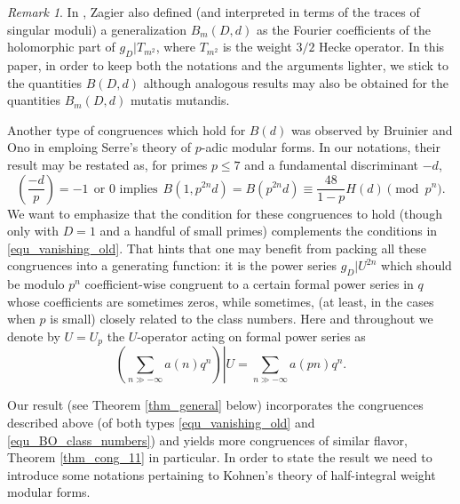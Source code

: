 \documentclass[11pt,letterpaper]{amsart}
\newcommand{\Q}{{\mathbb Q}}
\theoremstyle{remark}
\newtheorem*{rem}{Remark}
\begin{document}
\begin{rem}
In \cite{Zagier_traces}, Zagier also defined (and interpreted in terms of the traces of singular moduli) a generalization $B_m(D,d)$ as the Fourier coefficients of the holomorphic part of $g_D| T_{m^2}$, where $T_{m^2}$ is the weight $3/2$ Hecke operator. 
In this paper, in order to keep both the notations and the arguments lighter, we stick to the quantities $B(D,d)$ although analogous results may also be obtained for the quantities $B_m(D,d)$ mutatis mutandis. 
\end{rem}

Another type of congruences which hold for $B(d)$ was observed by Bruinier and Ono in \cite[Corollary 3]{BO} emploing Serre's theory of $p$-adic modular forms.
In our notations, their result may be restated as, 
for  primes $p \leq 7$ and a fundamental discriminant $-d$,
\begin{equation} \label{equ_BO_class_numbers}
\left( \frac{-d}{p} \right) =-1 ~~ \text{or $0$ implies} ~~ B(1,p^{2n}d)=B(p^{2n}d) \equiv \frac{48}{1-p}H(d) \pmod{p^n}.
\end{equation}
We want to emphasize that the condition for these congruences to hold (though only with $D=1$ and a handful of small primes)  complements the conditions in \eqref{equ_vanishing_old}.
That hints that one may benefit from packing all these congruences into a generating function: it is the power series $g_D|U^{2n}$ which should be modulo $p^n$ coefficient-wise congruent 
to a certain formal power series in $q$ 
whose coefficients are sometimes zeros, while sometimes, (at least, in the cases when $p$ is small) closely related to the class numbers. 
Here and throughout we denote by $U=U_p$ the $U$-operator acting on formal power series as 
\[
\left. \left( \sum_{n \gg -\infty} a(n) q^n \right) \right| U = \sum_{n \gg -\infty} a(pn) q^n.
\]

Our result (see Theorem \ref{thm_general} below) incorporates the congruences described above (of both types \eqref{equ_vanishing_old} and \eqref{equ_BO_class_numbers}) and yields  more congruences of similar flavor, Theorem \ref{thm_cong_11} in particular.
In order to state the result we need to introduce some notations pertaining to Kohnen's theory  \cite{Kohnen} of half-integral weight modular forms.
\end{document}
